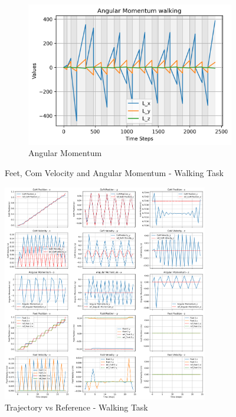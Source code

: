 \documentclass[main.tex]{subfiles}
\begin{document}
\begin{figure}[htbp]
\begin{subfigure}[b]{0.32\textwidth}
        \includegraphics[width=\textwidth]{figures/Angular Momentum walking.png}
        \caption{Angular Momentum}
        \label{fig:sub3}
    \end{subfigure}
    \caption{Feet, Com Velocity and Angular Momentum - Walking Task}
    \label{fig:threeimages}
\end{figure}
\begin{figure}[htbp]
    \centering
    \includegraphics[width=0.8\textwidth]{figures/contact_x_walking.png}
    \caption{Trajectory vs Reference - Walking Task}
    \label{fig:yourlabel}
\end{figure}
\end{document}
